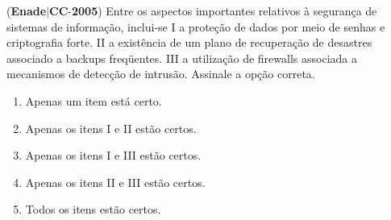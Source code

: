 \documentclass{exam}
\begin{document}
\begin{questions}
\begin{enumerate}[label=\alph*)]
	\end{enumerate}

\question (\textbf{Enade}$|$\textbf{CC}-\textbf{2005}) Entre os aspectos importantes relativos à segurança de sistemas
de informação, inclui-se
I a proteção de dados por meio de senhas e criptografia forte.
II a existência de um plano de recuperação de desastres
associado a backups freqüentes.
III a utilização de firewalls associada a mecanismos de
detecção de intrusão.
Assinale a opção correta.
	\begin{enumerate}[label=\alph*)]
		\item  Apenas um item está certo.
		\item  Apenas os itens I e II estão certos.
		\item  Apenas os itens I e III estão certos.
		\item  Apenas os itens II e III estão certos.
		\item  Todos os itens estão certos.

	\end{enumerate}


\end{questions}
\end{document}
